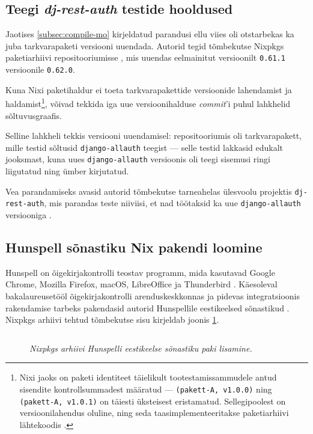 \subsection{Teegi \textit{dj-rest-auth} testide hooldused}

Jaotises \ref{subsec:compile-mo} kirjeldatud parandusi ellu viies oli otstarbekas ka juba tarkvarapaketi versiooni uuendada. Autorid tegid tõmbekutse Nixpkgs paketiarhiivi repositooriumisse \cite{allauth-bump-nixpkgs}, mis uuendas eelmainitut versioonilt \texttt{0.61.1} versioonile \texttt{0.62.0}.

Kuna Nixi paketihaldur ei toeta tarkvarapakettide versioonide lahendamist ja haldamist\footnote{Nixi jaoks on paketi identiteet täielikult tootestamissammudele antud sisendite kontrollsummadest määratud \cite{nixos-how-nix-works} — \texttt{(pakett-A, v1.0.0)} ning \texttt{(pakett-A, v1.0.1)} on täiesti üksteisest eristamatud. Sellegipoolest on versioonilahendus oluline, ning seda taasimplementeeritakse paketiarhiivi lähtekoodis \cite{python3-nix-versioning}.}, võivad tekkida iga uue versioonihalduse \emph{commit}'i puhul lahkhelid sõltuvusgraafis.

Selline lahkheli tekkis versiooni uuendamisel: repositooriumis oli tarkvarapakett, mille testid sõltusid \texttt{django-allauth} teegist \cite{test-dep} — selle testid lakkasid edukalt jooksmast, kuna uues \texttt{django-allauth} versioonis oli teegi sisemusi ringi liigutatud ning ümber kirjutatud.

Vea parandamiseks avasid autorid tõmbekutse tarneahelas ülesvoolu projektis \texttt{dj-rest-auth}, mis parandas teste niiviisi, et nad töötaksid ka uue \texttt{django-allauth} versiooniga \cite{dj-rest-pr}.

\subsection{Hunspell sõnastiku Nix pakendi loomine}

Hunspell on õigekirjakontrolli teostav programm, mida kasutavad Google Chrome, Mozilla Firefox, macOS, LibreOffice ja Thunderbird \cite{hunspell}.
Käesoleval bakalaureusetööl õigekirjakontrolli arenduskeskkonnas ja pidevas integratsioonis rakendamise tarbeks pakendasid autorid Hunspellile eestikeelsed sõnastikud \cite{hunspell-pr}. Nixpkgs arhiivi tehtud tõmbekutse sisu kirjeldab joonis \ref{fig:hunspell-pr}.

\begin{figure}
\inputminted[breaklines]{diff}{chapters/data/hunspell.diff}
\caption{\emph{Nixpkgs arhiivi Hunspelli eestikeelse sõnastiku paki lisamine.}}\label{fig:hunspell-pr}
\end{figure}

